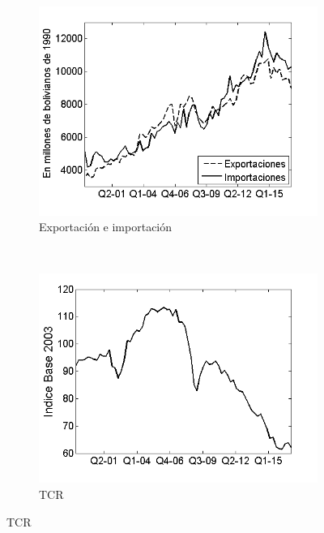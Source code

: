 \documentclass[12pt,letterpaper]{article}
\begin{document}
\begin{figure}
\centering
\caption{Variables incluidas en el modelo}\label{variables}
    \begin{subfigure}[b]{0.3\textwidth}
        \includegraphics[width=\textwidth]{1xm}
        \caption{Exportación e importación}
        \label{1xm}
    \end{subfigure}
    ~ %
    \begin{subfigure}[b]{0.3\textwidth}
        \includegraphics[width=\textwidth]{3tcr}
        \caption{TCR}
        \label{3tcr}
    \end{subfigure}

\end{figure}
\end{document}
